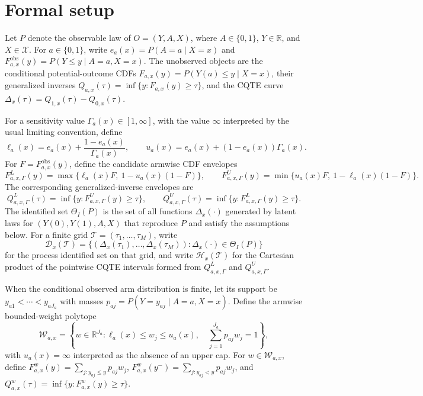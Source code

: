 \documentclass[11pt]{article}
\theoremstyle{definition}
\theoremstyle{plain}
\theoremstyle{remark}
\begin{document}
\section{Formal setup}
Let \(P\) denote the observable law of \(O=(Y,A,X)\), where \(A\in\{0,1\}\), \(Y\in\mathbb{R}\), and \(X\in\mathcal{X}\).  For \(a\in\{0,1\}\), write \(e_a(x)=P(A=a\mid X=x)\) and \(F^{\mathrm{obs}}_{a,x}(y)=P(Y\le y\mid A=a,X=x)\).  The unobserved objects are the conditional potential-outcome CDFs \(F_{a,x}(y)=P(Y(a)\le y\mid X=x)\), their generalized inverses \(Q_{a,x}(\tau)=\inf\{y:F_{a,x}(y)\ge \tau\}\), and the CQTE curve \(\Delta_x(\tau)=Q_{1,x}(\tau)-Q_{0,x}(\tau)\).

For a sensitivity value \(\Gamma_a(x)\in[1,\infty]\), with the value \(\infty\) interpreted by the usual limiting convention, define
\[
\ell_a(x)=e_a(x)+\frac{1-e_a(x)}{\Gamma_a(x)},\qquad
u_a(x)=e_a(x)+(1-e_a(x))\Gamma_a(x).
\]
For \(F=F^{\mathrm{obs}}_{a,x}(y)\), define the candidate armwise CDF envelopes
\[
F^L_{a,x,\Gamma}(y)=\max\{\ell_a(x)F,\ 1-u_a(x)(1-F)\},
\qquad
F^U_{a,x,\Gamma}(y)=\min\{u_a(x)F,\ 1-\ell_a(x)(1-F)\}.
\]
The corresponding generalized-inverse envelopes are
\[
Q^L_{a,x,\Gamma}(\tau)=\inf\{y:F^U_{a,x,\Gamma}(y)\ge \tau\},\qquad
Q^U_{a,x,\Gamma}(\tau)=\inf\{y:F^L_{a,x,\Gamma}(y)\ge \tau\}.
\]
The identified set \(\Theta_I(P)\) is the set of all functions \(\Delta_x(\cdot)\) generated by latent laws for \((Y(0),Y(1),A,X)\) that reproduce \(P\) and satisfy the assumptions below.  For a finite grid \(\mathcal{T}=(\tau_1,\ldots,\tau_M)\), write
\[
\mathcal{D}_x(\mathcal{T})=\{(\Delta_x(\tau_1),\ldots,\Delta_x(\tau_M)):\Delta_x(\cdot)\in\Theta_I(P)\}
\]
for the process identified set on that grid, and write \(\mathcal{H}_x(\mathcal{T})\) for the Cartesian product of the pointwise CQTE intervals formed from \(Q^L_{a,x,\Gamma}\) and \(Q^U_{a,x,\Gamma}\).

When the conditional observed arm distribution is finite, let its support be \(y_{a1}<\cdots<y_{aJ_a}\) with masses \(p_{aj}=P(Y=y_{aj}\mid A=a,X=x)\).  Define the armwise bounded-weight polytope
\[
\mathcal{W}_{a,x}=\left\{w\in\mathbb{R}^{J_a}:
\ell_a(x)\le w_j\le u_a(x),\quad \sum_{j=1}^{J_a}p_{aj}w_j=1\right\},
\]
with \(u_a(x)=\infty\) interpreted as the absence of an upper cap.  For \(w\in\mathcal{W}_{a,x}\), define \(F^w_{a,x}(y)=\sum_{j:y_{aj}\le y}p_{aj}w_j\), \(F^w_{a,x}(y^-)=\sum_{j:y_{aj}<y}p_{aj}w_j\), and \(Q^w_{a,x}(\tau)=\inf\{y:F^w_{a,x}(y)\ge\tau\}\).
\end{document}
